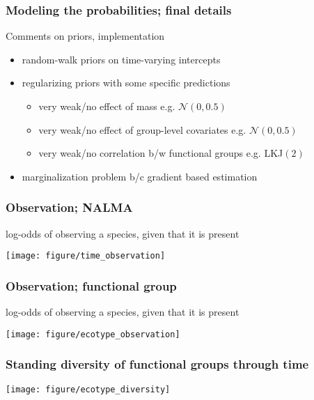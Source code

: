 \documentclass{beamer}
\begin{document}
\begin{frame}
  \frametitle{Modeling the probabilities; final details}

  \begin{block}{Comments on priors, implementation}
    \setlength\abovedisplayskip{-0.1cm}
    \begin{itemize}
      \item random-walk priors on time-varying intercepts
      \item regularizing priors with some specific predictions
        \begin{itemize}
          \item very weak/no effect of mass e.g. \(\mathcal{N}(0, 0.5)\)
          \item very weak/no effect of group-level covariates e.g. \(\mathcal{N}(0, 0.5)\)
          \item very weak/no correlation b/w functional groups e.g. LKJ\((2)\)
        \end{itemize}
      \item marginalization problem b/c gradient based estimation
    \end{itemize}
  \end{block}
\end{frame}

\begin{frame}
  \frametitle{Observation; NALMA}
  \begin{center}
    log-odds of observing a species, given that it is present

    \texttt{[image: figure/time\_observation]}
  \end{center}
\end{frame}

\begin{frame}
  \frametitle{Observation; functional group}
  \begin{center}
    log-odds of observing a species, given that it is present

    \texttt{[image: figure/ecotype\_observation]}
  \end{center}
\end{frame}


\begin{frame}
  \frametitle{Standing diversity of functional groups through time}
  \begin{center}
    \texttt{[image: figure/ecotype\_diversity]}
  \end{center}
\end{frame}
\end{document}

